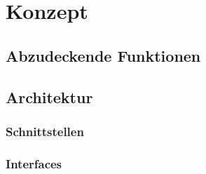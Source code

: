 \chapter{Konzept}
\label{chap:konzept}
\section{Abzudeckende Funktionen}
\section{Architektur}
\subsection{Schnittstellen}
\subsection{Interfaces}
